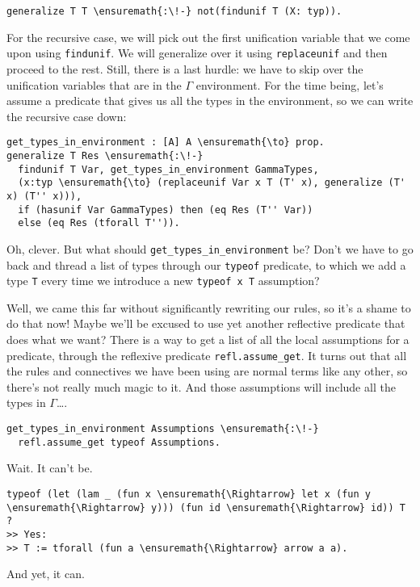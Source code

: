 \begin{verbatim}
generalize T T \ensuremath{:\!-} not(findunif T (X: typ)).
\end{verbatim}

\importantCodeblockEnd{}

For the recursive case, we will pick out the first unification variable
that we come upon using \texttt{findunif}. We will generalize over it
using \texttt{replaceunif} and then proceed to the rest. Still, there is
a last hurdle: we have to skip over the unification variables that are
in the \(\Gamma\) environment. For the time being, let's assume a
predicate that gives us all the types in the environment, so we can
write the recursive case down:

\importantCodeblock{}

\begin{verbatim}
get_types_in_environment : [A] A \ensuremath{\to} prop.
generalize T Res \ensuremath{:\!-}
  findunif T Var, get_types_in_environment GammaTypes,
  (x:typ \ensuremath{\to} (replaceunif Var x T (T' x), generalize (T' x) (T'' x))),
  if (hasunif Var GammaTypes) then (eq Res (T'' Var))
  else (eq Res (tforall T'')).
\end{verbatim}

\importantCodeblockEnd{}

\identDialog

\heroSTUDENT{} Oh, clever. But what should
\texttt{get\_types\_in\_environment} be? Don't we have to go back and
thread a list of types through our \texttt{typeof} predicate, to which
we add a type \texttt{T} every time we introduce a new
\texttt{typeof\ x\ T} assumption?

\heroADVISOR{} Well, we came this far without significantly rewriting our
rules, so it's a shame to do that now! Maybe we'll be excused to use yet
another reflective predicate that does what we want? There is a way to
get a list of all the local assumptions for a predicate, through the
reflexive predicate \texttt{refl.assume\_get}. It turns out that all the
rules and connectives we have been using are normal \lamprolog terms
like any other, so there's not really much magic to it. And those
assumptions will include all the types in \(\Gamma\)\ldots{}.

\importantCodeblock{}

\begin{verbatim}
get_types_in_environment Assumptions \ensuremath{:\!-}
  refl.assume_get typeof Assumptions.
\end{verbatim}

\importantCodeblockEnd{}

\heroSTUDENT{} Wait. It can't be.

\begin{verbatim}
typeof (let (lam _ (fun x \ensuremath{\Rightarrow} let x (fun y \ensuremath{\Rightarrow} y))) (fun id \ensuremath{\Rightarrow} id)) T ?
>> Yes:
>> T := tforall (fun a \ensuremath{\Rightarrow} arrow a a).
\end{verbatim}

\heroADVISOR{} And yet, it can.
